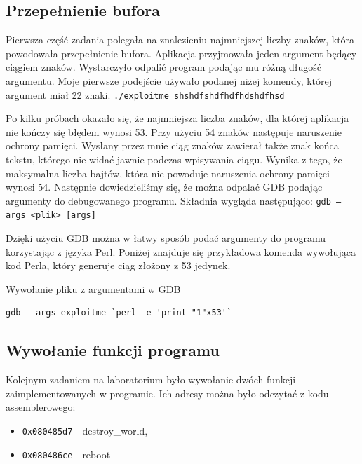 \documentclass[12pt,a4paper,titlepage]{article}
\begin{document}
\subsection{Przepełnienie bufora}
Pierwsza część zadania polegała na znalezieniu najmniejszej liczby znaków, która powodowała przepełnienie bufora. Aplikacja przyjmowała jeden argument będący ciągiem znaków. Wystarczyło odpalić program podając mu różną długość argumentu. Moje pierwsze podejście używało podanej niżej komendy, której argument miał 22 znaki.
\newline\newline
\texttt{./exploitme shshdfshdfhdfhdshdfhsd}
\newline

Po kilku próbach okazało się, że najmniejsza liczba znaków, dla której aplikacja nie kończy się błędem wynosi 53. Przy użyciu 54 znaków następuje naruszenie ochrony pamięci. Wysłany przez mnie ciąg znaków zawierał także znak końca tekstu, którego nie widać jawnie podczas wpisywania ciągu. Wynika z tego, że maksymalna liczba bajtów, która nie powoduje naruszenia ochrony pamięci wynosi 54.
Następnie dowiedzieliśmy się, że można odpalać GDB podając argumenty do debugowanego programu. Składnia wygląda następująco:
\newline\newline
\texttt{gdb --args <plik> [args]}
\newline

Dzięki użyciu GDB można w łatwy sposób podać argumenty do programu korzystając z języka Perl. Poniżej znajduje się przykładowa komenda wywołująca kod Perla, który generuje ciąg złożony z 53 jedynek.
\begin{listing}[H]
\caption{Wywołanie pliku z argumentami w GDB}
\begin{verbatim}
gdb --args exploitme `perl -e 'print "1"x53'`
\end{verbatim}
\end{listing}

\subsection{Wywołanie funkcji programu}
Kolejnym zadaniem na laboratorium było wywołanie dwóch funkcji zaimplementowanych w programie. Ich adresy można było odczytać z kodu assemblerowego:
\begin{itemize}
    \item \texttt{0x080485d7} - destroy\_world,
    \item \texttt{0x080486ce} - reboot
\end{itemize}
\end{document}
